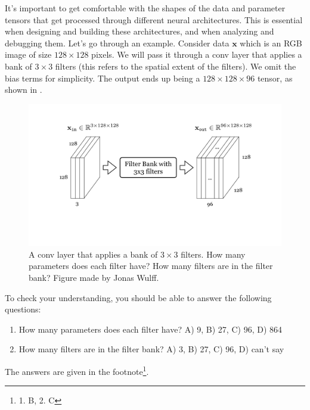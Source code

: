 It's important to get comfortable with the shapes of the data and parameter tensors that get processed through different neural architectures. This is essential when designing and building these architectures, and when analyzing and debugging them. Let's go through an example. Consider data $\mathbf{x}$ which is an RGB image of size $128 \times 128$ pixels. We will pass it through a conv layer that applies a bank of $3 \times 3$ filters (this refers to the spatial extent of the filters). We omit the bias terms for simplicity. The output ends up being a $128 \times 128 \times 96$ tensor, as shown in \fig{\ref{fig:convolutional_neural_nets:multichannel_conv_diagram}}.
\begin{figure}[h]
\centerline{
    \includegraphics[width=0.65\linewidth]{./figures/convolutional_neural_nets/multichannel_conv_diagram.pdf}}
    \caption{A conv layer that applies a bank of $3 \times 3$ filters. How many parameters does each filter have? How many filters are in the filter bank? Figure made by Jonas Wulff.}
    \label{fig:convolutional_neural_nets:multichannel_conv_diagram}
\end{figure}

To check your understanding, you should be able to answer the following questions:
\begin{enumerate}
    \item How many parameters does each filter have? A) 9, B) 27, C) 96, D) 864
    \item How many filters are in the filter bank? A) 3, B) 27, C) 96, D) can't say
\end{enumerate}
The answers are given in the footnote\footnote{1. B, 2. C}.



